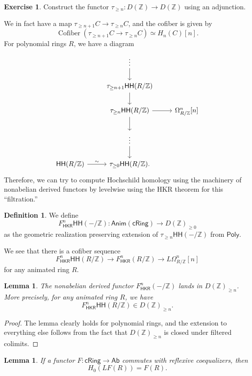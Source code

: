 \documentclass[10pt]{amsart}
\newtheorem{lem}[thm]{Lemma}
\theoremstyle{definition}
\newtheorem{defn}[thm]{Definition}
\newtheorem{exer}[thm]{Exercise}
\theoremstyle{remark}
\theoremstyle{plain}
\theoremstyle{definition}
\theoremstyle{remark}
\newcommand{\Z}{\mathbb{Z}}
\newcommand{\on}[1]{\operatorname{#1}}
\newcommand{\ms}[1]{\mathsf{#1}}
\newcommand{\1}{\mathbf{1}}
\newcommand{\2}{\mathbf{2}}
\newcommand{\3}{\mathbf{3}}
\newcommand{\HH}{\ms{HH}}
\begin{document}
\begin{exer}
    Construct the functor $\tau_{\geq n} \colon D(\Z) \to D(\Z)$ using an adjunction.
\end{exer}
We in fact have a map $\tau_{\geq n+1} C \to \tau_{\geq n} C$, and the cofiber is given by
\[ \on{Cofiber}(\tau_{\geq n+1} C \to \tau_{\geq n} C) \simeq H_n(C) [n]. \]
For polynomial rings $R$, we have a diagram
\begin{equation*}
\begin{tikzcd}
    & \vdots \ar{d} \\
    & \tau_{\geq n+1} \HH(R/\Z) \ar{d} \\
    & \tau_{\geq n} \HH(R/\Z) \ar{d} \ar{r} & \Omega^n_{R/\Z}[n] \\
    & \vdots \ar{d} & \\
    \HH(R/\Z) \ar{r}{\sim} & \tau_{\geq 0} \HH(R/\Z).
\end{tikzcd}
\end{equation*}
Therefore, we can try to compute Hochschild homology using the machinery of nonabelian derived functors by levelwise using the HKR theorem for this ``filtration.''

\begin{defn}
    We define
    \[ F^n_{\ms{HKR}} \HH(-/\Z) \colon \ms{Anim}(\ms{cRing}) \to D(\Z)_{\geq 0} \]
    as the geometric realization preserving extension of $\tau_{\geq n} \HH(-/\Z)$ from $\ms{Poly}$.
\end{defn}

We see that there is a cofiber sequence
\[ F_{\ms{HKR}}^n \HH(R/\Z) \to F^n_{\ms{HKR}}(R/\Z) \to L \Omega^n_{R/\Z}[n] \]
for any animated ring $R$.

\begin{lem}
    The nonabelian derived functor $F^n_{\ms{HKR}}(-/\Z)$ lands in $D(\Z)_{\geq n}$. More precisely, for any animated ring $R$, we have
    \[ F^n_{\ms{HKR}} \HH(R/\Z) \in D(\Z)_{\geq n}. \]
\end{lem}

\begin{proof}
    The lemma clearly holds for polynomial rings, and the extension to everything else follows from the fact that $D(\Z)_{\geq n}$ is closed under filtered colimits.
\end{proof}

\begin{lem}
    If a functor $F \colon \ms{cRing} \to \ms{Ab}$ commutes with reflexive coequalizers, then
    \[ H_0(LF(R)) = F(R). \]
\end{lem}
\end{document}
